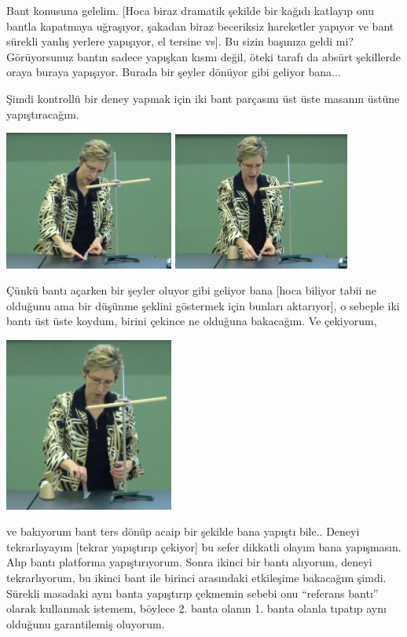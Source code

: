 \documentclass[12pt,fleqn]{article}\usepackage{../../common}
\begin{document}
Bant konusuna gelelim. [Hoca biraz dramatik şekilde bir kağıdı katlayıp onu
  bantla kapatmaya uğraşıyor, şakadan biraz beceriksiz hareketler yapıyor ve
  bant sürekli yanlış yerlere yapışıyor, el tersine vs]. Bu sizin başınıza geldi
mi?  Görüyorsunuz bantın sadece yapışkan kısmı değil, öteki tarafı da absürt
şekillerde oraya buraya yapışıyor. Burada bir şeyler dönüyor gibi geliyor bana...

Şimdi kontrollü bir deney yapmak için iki bant parçasını üst üste masanın üstüne
yapıştıracağım. 

\includegraphics[width=15em]{03_03.png}
\includegraphics[width=15.7em]{03_04.png}

Çünkü bantı açarken bir şeyler oluyor gibi geliyor bana [hoca biliyor tabii ne
olduğunu ama bir düşünme şeklini göstermek için bunları aktarıyor], o sebeple
iki bantı üst üste koydum, birini çekince ne olduğuna bakacağım. Ve çekiyorum,

\includegraphics[width=15em]{03_05.png}

ve bakıyorum bant ters dönüp acaip bir şekilde bana yapıştı bile.. Deneyi
tekrarlayayım [tekrar yapıştırıp çekiyor] bu sefer dikkatli olayım bana
yapışmasın. Alıp bantı platforma yapıştırıyorum.
Sonra ikinci bir bantı alıyorum, deneyi tekrarlıyorum, bu ikinci bant ile
birinci arasındaki etkileşime bakacağım şimdi. Sürekli masadaki aynı banta
yapıştırıp çekmemin sebebi onu ``referans bantı'' olarak kullanmak istemem,
böylece 2. banta olanın 1. banta olanla tıpatıp aynı olduğunu garantilemiş
oluyorum. 
\end{document}
